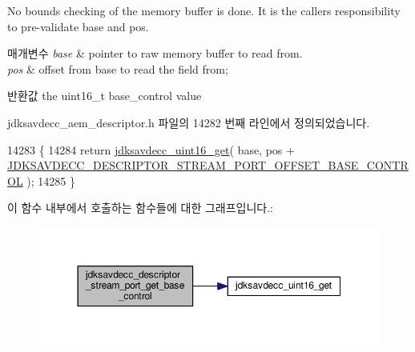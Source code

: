 No bounds checking of the memory buffer is done. It is the caller\textquotesingle{}s responsibility to pre-\/validate base and pos.


\begin{DoxyParams}{매개변수}
{\em base} & pointer to raw memory buffer to read from. \\
\hline
{\em pos} & offset from base to read the field from; \\
\hline
\end{DoxyParams}
\begin{DoxyReturn}{반환값}
the uint16\+\_\+t base\+\_\+control value 
\end{DoxyReturn}


jdksavdecc\+\_\+aem\+\_\+descriptor.\+h 파일의 14282 번째 라인에서 정의되었습니다.


\begin{DoxyCode}
14283 \{
14284     \textcolor{keywordflow}{return} \hyperlink{group__endian_ga3fbbbc20be954aa61e039872965b0dc9}{jdksavdecc\_uint16\_get}( base, pos + 
      \hyperlink{group__descriptor__stream__port_gab23c7cbdd4f79337bdb1092b05f9427a}{JDKSAVDECC\_DESCRIPTOR\_STREAM\_PORT\_OFFSET\_BASE\_CONTROL} 
      );
14285 \}
\end{DoxyCode}


이 함수 내부에서 호출하는 함수들에 대한 그래프입니다.\+:
\nopagebreak
\begin{figure}[H]
\begin{center}
\leavevmode
\includegraphics[width=350pt]{group__descriptor__stream__port_ga75cb0d52e8f2b03cf7de1562dd1b98df_cgraph}
\end{center}
\end{figure}




